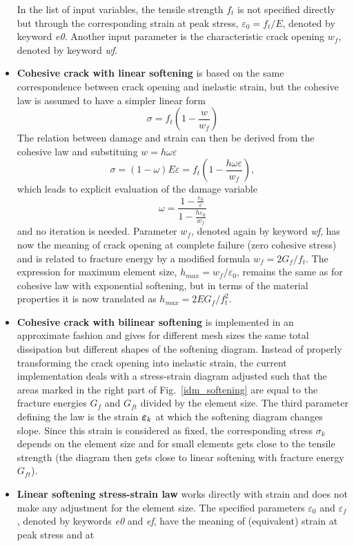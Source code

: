 \documentclass[a4paper]{article}
\newcommand{\mbf}[1]{\mbox{\boldmath$#1$}}
\newcommand{\eps} {\mbf{\varepsilon}}
\begin{document}
\begin{itemize}
In the list of input variables, the tensile strength $f_t$ is not specified
directly but through the corresponding strain at peak stress, 
$\varepsilon_0=f_t/E$, denoted by keyword {\it e0}. Another input parameter
is the characteristic crack opening $w_f$, denoted by keyword {\it wf}.
\item
{\bf Cohesive crack with linear softening} is based on the same correspondence
between crack opening and inelastic strain, but the cohesive law is assumed
to have a simpler linear form
$$
\sigma = f_t\left(1-\frac{w}{w_f}\right)
$$
The relation between damage and strain can then be derived from the cohesive law and 
substituing $w=h \omega \varepsilon$
$$
\sigma = (1-\omega)E\varepsilon =  f_t\left(1-\frac{h \omega \varepsilon}{w_f}\right),
$$
which leads to explicit evaluation of the damage variable
$$
\omega=\frac{1-\displaystyle\frac{\varepsilon_0}{\varepsilon}}{1-\displaystyle\frac{h\varepsilon_0}{w_f}}
$$
and no iteration is needed. Parameter $w_f$,
denoted again by keyword {\it wf}, has now the meaning of crack opening
at complete failure (zero cohesive stress) and is related to fracture energy by
a modified formula $w_f=2G_f/f_t$.
The expression for maximum element size, $h_{max}=w_f/\varepsilon_0$, remains
the same as for cohesive law with exponential softening, but in terms
of the material properties it is now translated as $h_{max}=2EG_f/f_t^2$.
\item
{\bf Cohesive crack with bilinear softening} is implemented in an
approximate fashion and gives for different mesh sizes the same
total dissipation but different shapes of the softening diagram.
Instead of properly transforming the crack opening into inelastic strain,
the current implementation deals with a stress-strain diagram adjusted
such that the areas marked in the right part of Fig.~\ref{idm_softening}
are equal to the fracture energies $G_f$ and $G_{ft}$ divided by the
element size. The third parameter defining the law is the strain
$\eps_k$ at which the softening diagram changes slope. Since this
strain is considered as fixed, the corresponding stress $\sigma_k$
depends on the element size and for small elements gets close to the
tensile strength (the diagram then gets close to linear softening
with fracture energy  $G_{ft}$). 
\item
{\bf Linear softening stress-strain law} works directly with strain
and does not make any adjustment for the element size. The specified
parameters $\varepsilon_0$ and $\varepsilon_f$, denoted by keywords {\it e0}
and {\it ef}, have the meaning of (equivalent) strain at peak stress and at

\end{itemize}
\end{document}
